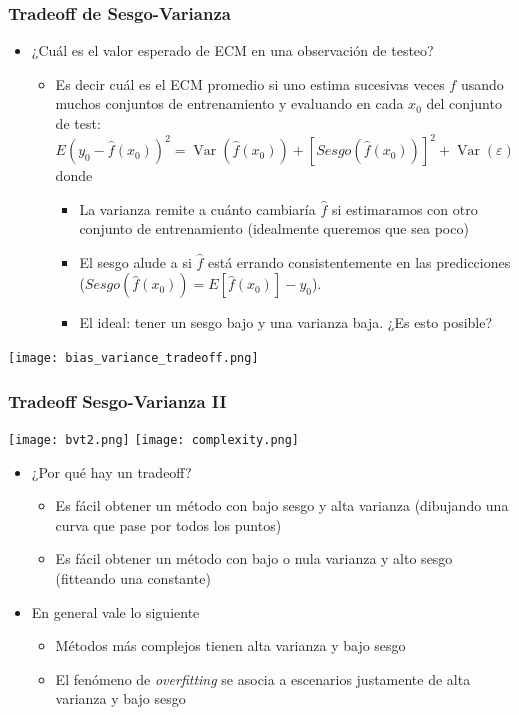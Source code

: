 \documentclass[leqno, 10pt, envcountsect]{beamer}
\numberwithin{equation}{section}
\theoremstyle{definition}
\theoremstyle{example}
\numberwithin{figure}{section}
\numberwithin{table}{section}
\let\olditem\item
\renewcommand{\item}{%
\olditem\vspace{1pt}}
\DeclareMathOperator{\var}{\mathrm{Var}}
\begin{document}
\begin{frame}[fragile=singleslide]
  \frametitle{Tradeoff de Sesgo-Varianza}
  \begin{itemize}
    \item ¿Cuál es el valor esperado de ECM en una observación de testeo?
      \begin{itemize}
        \item Es decir cuál es el ECM promedio si uno estima sucesivas veces
          $f$ usando muchos conjuntos de entrenamiento y evaluando en cada $x_{0}$
            del conjunto de test:
      \begin{equation*}
        E(y_{0} - \hat{f}(x_{0}))^{2} = \var(\hat{f}(x_{0})) +
        \left[Sesgo(\hat{f}(x_{0}))\right]^{2} + \var(\varepsilon)
      \end{equation*}
      donde
      \begin{itemize}
        \item La varianza remite a cuánto cambiaría $\hat{f}$ si estimaramos
          con otro conjunto de entrenamiento (idealmente queremos que sea
          poco)
        \item El sesgo alude a si $\hat{f}$ está errando consistentemente en
          las predicciones ($Sesgo(\hat{f}(x_{0})) = E[\hat{f}(x_{0})] -
          y_{0}$).
        \item El ideal: tener un sesgo bajo y una varianza baja. ¿Es esto
          posible?
      \end{itemize}
  \end{itemize}
  \end{itemize}
  \begin{center}
    \texttt{[image: bias\_variance\_tradeoff.png]}
  \end{center}
\end{frame}
\begin{frame}[fragile=singleslide]
  \frametitle{Tradeoff Sesgo-Varianza II}
  \begin{center}
    \texttt{[image: bvt2.png]}
    \texttt{[image: complexity.png]}
  \end{center}
  \begin{itemize}
    \item ¿Por qué hay un tradeoff?
      \begin{itemize}
        \item Es fácil obtener un método con bajo sesgo y alta varianza
          (dibujando una curva que pase por todos los puntos)
        \item Es fácil obtener un método con bajo o nula varianza y alto sesgo
          (fitteando una constante)
      \end{itemize}
    \item En general vale lo siguiente
      \begin{itemize}
        \item Métodos más complejos tienen alta varianza y bajo sesgo
        \item El fenómeno de \textit{overfitting} se asocia a escenarios
          justamente de alta varianza y bajo sesgo
      \end{itemize}
  \end{itemize}
\end{frame}
\end{document}
